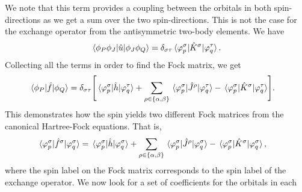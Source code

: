             We note that this term provides a coupling between the orbitals in
            both spin-directions as we get a sum over the two spin-directions.
            This is not the case for the exchange operator from the
            antisymmetric two-body elements.
            We have
            \begin{align}
                \mel*{\phi_P\phi_J}{
                    \hat{u}
                }{\phi_J\phi_Q}
                =
                \delta_{\sigma\tau}
                \mel*{\varphi^{\sigma}_{p}}{
                    \hat{K}^{\sigma}
                }{\varphi^{\tau}_{q}}.
            \end{align}
            Collecting all the terms in order to find the Fock matrix, we get
            \begin{align}
                \mel*{\phi_P}{\hat{f}}{\phi_Q}
                &=
                \delta_{\sigma\tau}
                \Biggl[
                    \mel*{\varphi^{\sigma}_{p}}{
                        \hat{h}
                    }{\varphi^{\tau}_{q}}
                    +
                    \sum_{\rho \in \left\{ \alpha, \beta \right\}}
                    \mel*{\varphi^{\sigma}_{p}}{
                        \hat{J}^{\rho}
                    }{\varphi^{\tau}_{q}}
                    -
                    \mel*{\varphi^{\sigma}_{p}}{
                        \hat{K}^{\sigma}
                    }{\varphi^{\tau}_{q}}
                \Biggr].
            \end{align}
            This demonstrates how the spin yields two different Fock matrices
            from the canonical Hartree-Fock equations.
            That is,
            \begin{align}
                \mel*{\varphi^{\sigma}_{p}}{
                    \hat{f}^{\sigma}
                }{\varphi^{\sigma}_{q}}
                &=
                \mel*{\varphi^{\sigma}_{p}}{
                    \hat{h}
                }{\varphi^{\sigma}_{q}}
                +
                \sum_{\rho \in \left\{ \alpha, \beta \right\}}
                \mel*{\varphi^{\sigma}_{p}}{
                    \hat{J}^{\rho}
                }{\varphi^{\sigma}_{q}}
                -
                \mel*{\varphi^{\sigma}_{p}}{
                    \hat{K}^{\sigma}
                }{\varphi^{\sigma}_{q}},
            \end{align}
            where the spin label on the Fock matrix corresponds to the spin
            label of the exchange operator.
            We now look for a set of coefficients for the orbitals in each
